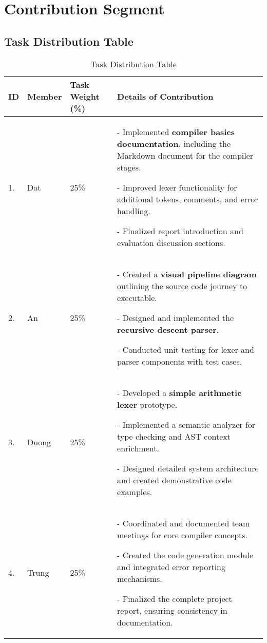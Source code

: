 \documentclass[11pt]{article}
\begin{document}
\section*{Contribution Segment}

\subsection*{Task Distribution Table}

\begin{table}[h!]
\centering
\renewcommand{\arraystretch}{1.5}
\begin{tabular}{|p{}|p{}|p{}|p{}|}
\hline
\textbf{ID} & \textbf{Member} & \textbf{Task Weight (\%)} & \textbf{Details of Contribution} \\ 
\hline
1. & Dat & 25\% & - Implemented \textbf{compiler basics documentation}, including the Markdown document for the compiler stages. \par
- Improved lexer functionality for additional tokens, comments, and error handling.\par 
- Finalized report introduction and evaluation discussion sections. \\
\hline
2. & An & 25\% & - Created a \textbf{visual pipeline diagram} outlining the source code journey to executable.\par 
- Designed and implemented the \textbf{recursive descent parser}. \par
- Conducted unit testing for lexer and parser components with test cases. \\
\hline
3. & Duong & 25\% & - Developed a \textbf{simple arithmetic lexer} prototype. \par
- Implemented a semantic analyzer for type checking and AST context enrichment.\par 
- Designed detailed system architecture and created demonstrative code examples. \\
\hline
4. & Trung & 25\% & - Coordinated and documented team meetings for core compiler concepts.\par 
- Created the code generation module and integrated error reporting mechanisms.\par 
- Finalized the complete project report, ensuring consistency in documentation. \\
\hline
\end{tabular}
\caption{Task Distribution Table}
\end{table}
\end{document}
